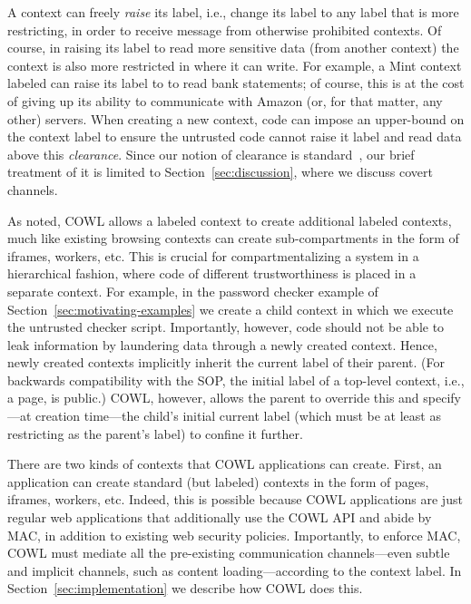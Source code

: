 A context can freely \emph{raise} its label, i.e., change its label to
any label that is more restricting, in order to receive message
from otherwise prohibited contexts.
%
Of course, in raising its label to read more sensitive data (from
another context) the context is also more restricted in where it can
write.
%
For example, a Mint context labeled
 can raise its label to
 to read bank statements; of
course, this is at the cost of giving up its ability to communicate
with Amazon (or, for that matter, any other) servers.
%
When creating a new context, code can impose an upper-bound
on the context label to ensure the untrusted code cannot raise it
label and read data above this \emph{clearance}.
%
Since our notion of clearance is
standard~\cite{efstathopoulos:asbestos, Zeldovich:2006,
stefan:2011:flexible, Breeze13}, our brief treatment of it is limited
to Section~\ref{sec:discussion}, where we discuss covert channels.

As noted, COWL allows a labeled context to create additional labeled contexts,
much like existing browsing contexts can create sub-compartments
in the form of iframes, workers, etc.
%
This is crucial for compartmentalizing a system in a hierarchical
fashion, where code of different trustworthiness is placed in
a separate context.
%
For example, in the password checker example of
Section~\ref{sec:motivating-examples} we create a child context in
which we execute the untrusted checker script.
%
Importantly, however, code should not be able to leak information by
laundering data through a newly created context.
%
Hence, newly created contexts implicitly inherit the current label of
their parent.
%
(For backwards compatibility with the SOP, the initial label of a
top-level context, i.e., a page, is public.) 
%
COWL, however, allows the parent to override this and specify---at
creation time---the child's initial current label (which must be at
least as restricting as the parent's label) to confine it further.

There are two kinds of contexts that COWL applications can create.
%
First, an application can create standard (but labeled) contexts in
the form of pages, iframes, workers, etc.
%
Indeed, this is possible because COWL applications are just regular
web applications that additionally use the COWL API and abide by MAC,
in addition to existing web security policies.
%
Importantly, to enforce MAC, COWL must mediate all the pre-existing
communication channels---even subtle and implicit channels, such as
content loading---according to the context label.
%
In Section~\ref{sec:implementation} we describe how COWL does this.

